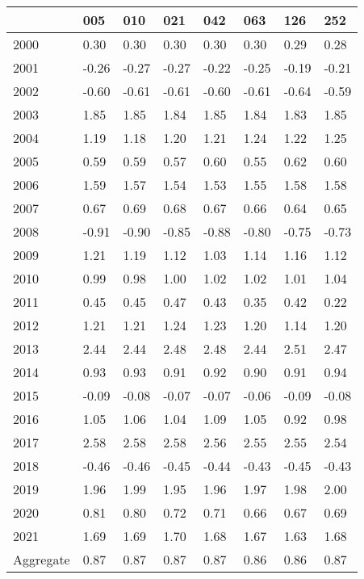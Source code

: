 \begin{tabular}{llllllll}
\toprule
 & 005 & 010 & 021 & 042 & 063 & 126 & 252 \\
\midrule
2000 & 0.30 & 0.30 & 0.30 & 0.30 & 0.30 & 0.29 & 0.28 \\
2001 & -0.26 & -0.27 & -0.27 & -0.22 & -0.25 & -0.19 & -0.21 \\
2002 & -0.60 & -0.61 & -0.61 & -0.60 & -0.61 & -0.64 & -0.59 \\
2003 & 1.85 & 1.85 & 1.84 & 1.85 & 1.84 & 1.83 & 1.85 \\
2004 & 1.19 & 1.18 & 1.20 & 1.21 & 1.24 & 1.22 & 1.25 \\
2005 & 0.59 & 0.59 & 0.57 & 0.60 & 0.55 & 0.62 & 0.60 \\
2006 & 1.59 & 1.57 & 1.54 & 1.53 & 1.55 & 1.58 & 1.58 \\
2007 & 0.67 & 0.69 & 0.68 & 0.67 & 0.66 & 0.64 & 0.65 \\
2008 & -0.91 & -0.90 & -0.85 & -0.88 & -0.80 & -0.75 & -0.73 \\
2009 & 1.21 & 1.19 & 1.12 & 1.03 & 1.14 & 1.16 & 1.12 \\
2010 & 0.99 & 0.98 & 1.00 & 1.02 & 1.02 & 1.01 & 1.04 \\
2011 & 0.45 & 0.45 & 0.47 & 0.43 & 0.35 & 0.42 & 0.22 \\
2012 & 1.21 & 1.21 & 1.24 & 1.23 & 1.20 & 1.14 & 1.20 \\
2013 & 2.44 & 2.44 & 2.48 & 2.48 & 2.44 & 2.51 & 2.47 \\
2014 & 0.93 & 0.93 & 0.91 & 0.92 & 0.90 & 0.91 & 0.94 \\
2015 & -0.09 & -0.08 & -0.07 & -0.07 & -0.06 & -0.09 & -0.08 \\
2016 & 1.05 & 1.06 & 1.04 & 1.09 & 1.05 & 0.92 & 0.98 \\
2017 & 2.58 & 2.58 & 2.58 & 2.56 & 2.55 & 2.55 & 2.54 \\
2018 & -0.46 & -0.46 & -0.45 & -0.44 & -0.43 & -0.45 & -0.43 \\
2019 & 1.96 & 1.99 & 1.95 & 1.96 & 1.97 & 1.98 & 2.00 \\
2020 & 0.81 & 0.80 & 0.72 & 0.71 & 0.66 & 0.67 & 0.69 \\
2021 & 1.69 & 1.69 & 1.70 & 1.68 & 1.67 & 1.63 & 1.68 \\
Aggregate & 0.87 & 0.87 & 0.87 & 0.87 & 0.86 & 0.86 & 0.87 \\
\bottomrule
\end{tabular}
